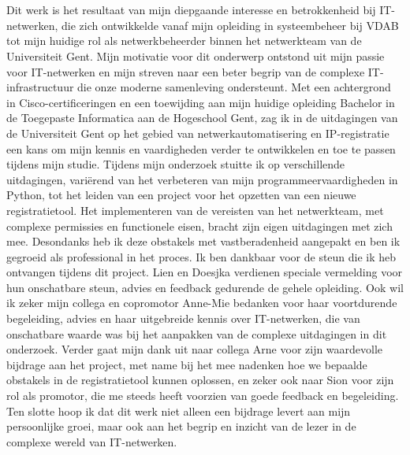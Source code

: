 
\chapter*{}%
\label{ch:voorwoord}

Dit werk is het resultaat van mijn diepgaande interesse en betrokkenheid bij IT-netwerken, die zich ontwikkelde vanaf mijn opleiding in systeembeheer bij VDAB tot mijn huidige rol als netwerkbeheerder binnen het netwerkteam van de Universiteit Gent.
Mijn motivatie voor dit onderwerp ontstond uit mijn passie voor IT-netwerken en mijn streven naar een beter begrip van de complexe IT-infrastructuur die onze moderne samenleving ondersteunt. 
Met een achtergrond in Cisco-certificeringen en een toewijding aan mijn huidige opleiding Bachelor in de Toegepaste Informatica aan de Hogeschool Gent, zag ik in de uitdagingen van de Universiteit Gent op het gebied van netwerkautomatisering en IP-registratie een kans om mijn kennis en vaardigheden verder te ontwikkelen en toe te passen tijdens mijn studie.
Tijdens mijn onderzoek stuitte ik op verschillende uitdagingen, variërend van het verbeteren van mijn programmeervaardigheden in Python, tot het leiden van een project voor het opzetten van een nieuwe registratietool. Het implementeren van de vereisten van het netwerkteam, met complexe permissies en functionele eisen, bracht zijn eigen uitdagingen met zich mee. Desondanks heb ik deze obstakels met vastberadenheid aangepakt en ben ik gegroeid als professional in het proces.
Ik ben dankbaar voor de steun die ik heb ontvangen tijdens dit project. Lien en Doesjka verdienen speciale vermelding voor hun onschatbare steun, advies en feedback gedurende de gehele opleiding. Ook wil ik zeker mijn collega en copromotor Anne-Mie bedanken voor haar voortdurende begeleiding, advies en haar uitgebreide kennis over IT-netwerken, die van onschatbare waarde was bij het aanpakken van de complexe uitdagingen in dit onderzoek. Verder gaat mijn dank uit naar collega Arne voor zijn waardevolle bijdrage aan het project, met name bij het mee nadenken hoe we bepaalde obstakels in de registratietool kunnen oplossen, en zeker ook naar Sion voor zijn rol als promotor, die me steeds heeft voorzien van goede feedback en begeleiding.
Ten slotte hoop ik dat dit werk niet alleen een bijdrage levert aan mijn persoonlijke groei, maar ook aan het begrip en inzicht van de lezer in de complexe wereld van IT-netwerken.
